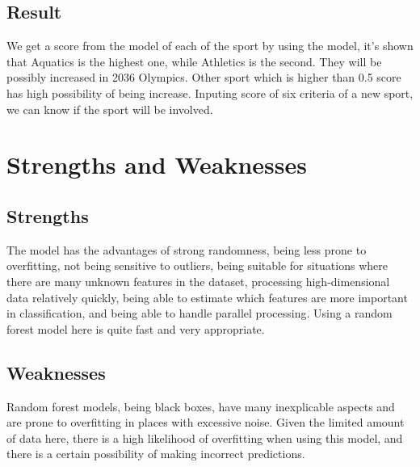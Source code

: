 \documentclass[a4paper]{article}
\begin{document}
\subsection{Result}
We get a score from the model of each of the sport by using the model, it's shown that Aquatics is the highest one, while Athletics is the second. They will be possibly increased in 2036 Olympics. Other sport which is higher than 0.5 score has high possibility of being increase. Inputing score of six criteria of a new sport, we can know if the sport will be involved.
\section{Strengths and Weaknesses}

\subsection{Strengths}
The model has the advantages of strong randomness, being less prone to overfitting, not being sensitive to outliers, being suitable for situations where there are many unknown features in the dataset, processing high-dimensional data relatively quickly, being able to estimate which features are more important in classification, and being able to handle parallel processing. Using a random forest model here is quite fast and very appropriate.%
\subsection{Weaknesses}
Random forest models, being black boxes, have many inexplicable aspects and are prone to overfitting in places with excessive noise. Given the limited amount of data here, there is a high likelihood of overfitting when using this model, and there is a certain possibility of making incorrect predictions.%
\end{document}
